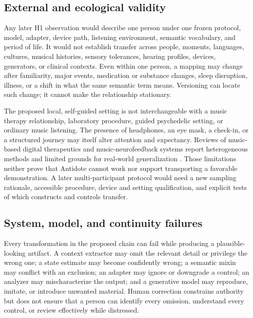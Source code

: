 \subsection{External and ecological validity}
\label{sec:limitations-external-validity}

Any later H1 observation would describe one person under one frozen protocol,
model, adapter, device path, listening environment, semantic vocabulary, and
period of life. It would not establish transfer across people, moments,
languages, cultures, musical histories, sensory tolerances, hearing profiles,
devices, generators, or clinical contexts. Even within one person, a mapping
may change after familiarity, major events, medication or substance changes,
sleep disruption, illness, or a shift in what the same semantic term means.
Versioning can locate such change; it cannot make the relationship stationary.

The proposed local, self-guided setting is not interchangeable with a music
therapy relationship, laboratory procedure, guided psychedelic setting, or
ordinary music listening. The presence of headphones, an eye mask, a check-in,
or a structured journey may itself alter attention and expectancy. Reviews of
music-based digital therapeutics and music-neurofeedback systems report
heterogeneous methods and limited grounds for real-world generalization
\citep{venkatesan2026mdt,sayal2025musicloop}. Those limitations neither prove
that Antidote cannot work nor support transporting a favorable demonstration.
A later multi-participant protocol would need a new sampling rationale,
accessible procedure, device and setting qualification, and explicit tests of
which constructs and controls transfer.

\subsection{System, model, and continuity failures}
\label{sec:limitations-system-failures}

Every transformation in the proposed chain can fail while producing a
plausible-looking artifact. A context extractor may omit the relevant detail or
privilege the wrong one; a state estimate may become confidently wrong; a
semantic mixin may conflict with an exclusion; an adapter may ignore or
downgrade a control; an analyzer may mischaracterize the output; and a
generative model may reproduce, imitate, or introduce unwanted material. Human
correction constrains authority but does not ensure that a person can identify
every omission, understand every control, or review effectively while
distressed.


